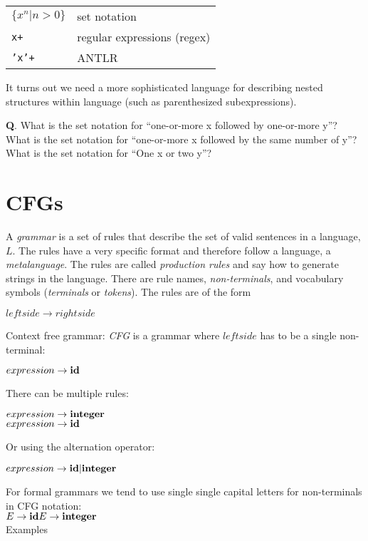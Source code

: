 \documentclass[11pt,twocolumn,nocopyright]{sigplanconf}
\begin{document}
\begin{tabular}{ll}
$\{ x^n | n > 0\}$	&	set notation\\
{\tt x+}		&	 regular expressions (regex)\\
{\tt 'x'+}	&		ANTLR\\
\end{tabular}

It turns out we need a more sophisticated language for describing nested structures within language (such as parenthesized subexpressions).

{\bf Q}.  What is the set notation for ``one-or-more x followed by one-or-more y''? What is the set notation for ``one-or-more x followed by the same number of y''? What is the set notation for ``One x or two y''?

\section{CFGs}

A {\em grammar} is a set of rules that describe the set of valid sentences in a language, $L$. The rules have a very specific format and therefore follow a language, a {\em metalanguage}. The rules are called {\em production rules} and say how to generate strings in the language. There are rule names, {\em non-terminals}, and vocabulary symbols ({\em terminals} or {\em tokens}). The rules are of the form

$leftside \rightarrow rightside$

Context free grammar: {\em CFG} is a grammar where $leftside$ has to be a single non-terminal:

$expression \rightarrow {\bf id}$

\noindent There can be multiple rules:

\noindent $expression \rightarrow {\bf integer}$\\
$expression \rightarrow {\bf id}$

\noindent Or using the alternation operator:

$expression \rightarrow {\bf id} | {\bf integer}$

\noindent For formal grammars we tend to use single single capital letters for non-terminals in CFG notation:\\

\noindent $
E \rightarrow {\bf id} \\
E \rightarrow {\bf integer}$\\

\noindent Examples\\
 
\end{document}

